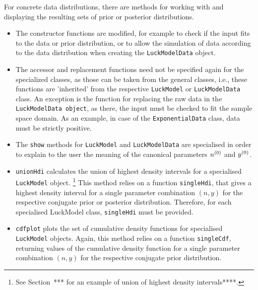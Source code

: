 For concrete data distributions, there are methods for working with
and displaying the resulting sets of prior or posterior distributions.
\begin{itemize}
\item The constructor functions are modified, for example to check if the input
   fits to the data or prior distribution, or to allow the simulation of data
   according to the data distribution when creating the \texttt{LuckModelData} object.
\item The accessor and replacement functions need not be specified again for the
   specialized classes, as those can be taken from the general classes, i.e.,
   these functions are 'inherited' from the respective \texttt{LuckModel} or \texttt{LuckModelData}
   class. An exception is the function for replacing the raw data in the
   \texttt{LuckModelData object}, as there, the input must be checked to fit the sample
   space domain. As an example, in case of the \texttt{ExponentialData} class, data must be
   strictly positive.
\item The \texttt{show} methods for \texttt{LuckModel} and \texttt{LuckModelData} are specialised in order
   to explain to the user the meaning of the canonical parameters $n^{(0)}$ and $y^{(0)}$.
\item \texttt{unionHdi} calculates the union of highest density intervals for a
   specialised \texttt{LuckModel} object.%
   \footnote{See Section~*** for an example of union of highest density intervals****.}
   This method relies on a function \texttt{singleHdi},
   that gives a highest density interval for a single parameter combination
   $(n, y)$ for the respective conjugate prior or posterior distribution.
   Therefore, for each specialised LuckModel class, \texttt{singleHdi} must be
   provided.
\item \texttt{cdfplot} plots the set of cumulative density functions for specialised
   \texttt{LuckModel} objects. Again, this method relies on a function \texttt{singleCdf},
   returning values of the cumulative density function for a single parameter combination $(n, y)$
   for the respective conjugate prior distribution.
\end{itemize}












